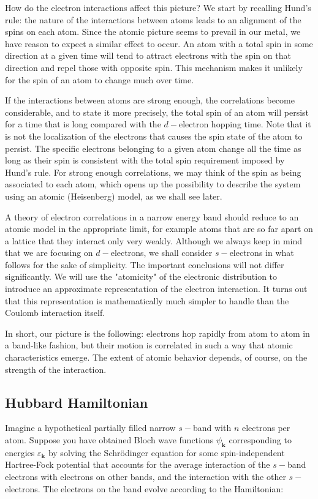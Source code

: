How do the electron interactions affect this picture?
We start by recalling Hund's rule: the nature of the  interactions between atoms leads to an alignment of the spins on each atom.
Since the atomic picture seems to prevail in our metal, we have reason to expect a similar effect to occur.
An atom with a total spin in some direction at a given time will tend to attract electrons with the spin on that direction and repel those with opposite spin.
This mechanism makes it unlikely for the spin of an atom to change much over time.

If the interactions between atoms are strong enough, the correlations become considerable, and to state it more precisely, the total spin of an atom will persist for a time that is long compared with the $d-$electron hopping time.
Note that it is not the localization of the electrons that causes the spin state of the atom to persist.
The specific electrons belonging to a given atom change all the time as long as their spin is consistent with the total spin requirement imposed by Hund's rule.
For strong enough correlations, we may think of the spin as being associated to each atom, which opens up the possibility to describe the system using an atomic (Heisenberg) model, as we shall see later.

A theory of electron correlations in a narrow energy band should reduce to an atomic model in the appropriate limit, for example atoms that are so far apart on a lattice that they interact only very weakly.
Although we always keep in mind that we are focusing on $d-$electrons, we shall consider $s-$electrons in what follows for the sake of simplicity.
The important conclusions will not differ significantly.
We will use the "atomicity" of the electronic distribution to introduce an approximate representation of the electron interaction.
It turns out that this representation is mathematically much simpler to handle than the Coulomb interaction itself.

In short, our picture is the following: electrons hop rapidly from atom to atom in a band-like fashion, but their motion is correlated in such a way that atomic characteristics emerge.
The extent of atomic behavior depends, of course, on the strength of the interaction.

\subsection{Hubbard Hamiltonian}\label{subsec:hubbardHamiltonian}

Imagine a hypothetical partially filled narrow $s-$band with $n$ electrons per atom.
Suppose you have obtained Bloch wave functions $\psi_{\bm k}$ corresponding to energies $\varepsilon_{\bm k}$ by solving the Schr\"odinger equation for some spin-independent Hartree-Fock potential that accounts for the average interaction of the $s-$band electrons with electrons on other bands, and the interaction with the other $s-$electrons.
The electrons on the band evolve according to the Hamiltonian:

